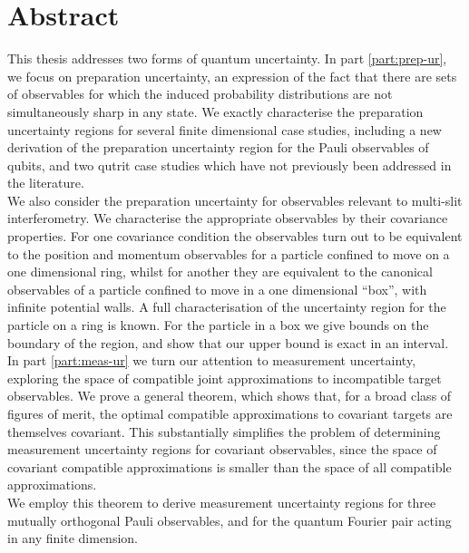 



\chapter*{Abstract}
This thesis addresses two forms of quantum uncertainty. In part \ref{part:prep-ur}, we focus on preparation uncertainty, an expression of the fact that there are sets of observables for which the induced probability distributions are not simultaneously sharp in any state. We exactly characterise the preparation uncertainty regions for several finite dimensional case studies, including a new derivation of the preparation uncertainty region for the Pauli observables of qubits, and two qutrit case studies which have not previously been addressed in the literature.\\
We also consider the preparation uncertainty for observables relevant to multi-slit interferometry. We characterise the appropriate observables by their covariance properties. For one covariance condition the observables turn out to be equivalent to the position and momentum observables for a particle confined to move on a one dimensional ring, whilst for another they are equivalent to the canonical observables of a particle confined to move in a one dimensional ``box'', with infinite potential walls. A full characterisation of the uncertainty region for the particle on a ring is known. For the particle in a box we give bounds on the boundary of the region, and show that our upper bound is exact in an interval.\\
In part \ref{part:meas-ur} we turn our attention to measurement uncertainty, exploring the space of compatible joint approximations to incompatible target observables. We prove a general theorem, which shows that, for a broad class of figures of merit, the optimal compatible approximations to covariant targets are themselves covariant. This substantially simplifies the problem of determining measurement uncertainty regions for covariant observables, since the space of covariant compatible approximations is smaller than the space of all compatible approximations.\\
We employ this theorem to derive measurement uncertainty regions for three mutually orthogonal Pauli observables, and for the quantum Fourier pair acting in any finite dimension.
\clearpage